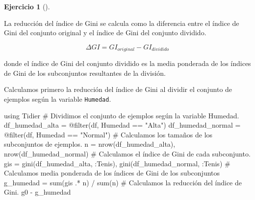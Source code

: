 \documentclass[
  a4paper,
]{scrreport}
\newenvironment{Shaded}{\begin{snugshade}}{\end{snugshade}}
\newcommand{\BuiltInTok}[1]{\textcolor[rgb]{0.00,0.23,0.31}{#1}}
\newcommand{\CommentTok}[1]{\textcolor[rgb]{0.37,0.37,0.37}{#1}}
\newcommand{\FunctionTok}[1]{\textcolor[rgb]{0.28,0.35,0.67}{#1}}
\newcommand{\ImportTok}[1]{\textcolor[rgb]{0.00,0.46,0.62}{#1}}
\newcommand{\NormalTok}[1]{\textcolor[rgb]{0.00,0.23,0.31}{#1}}
\newcommand{\OperatorTok}[1]{\textcolor[rgb]{0.37,0.37,0.37}{#1}}
\newcommand{\PreprocessorTok}[1]{\textcolor[rgb]{0.68,0.00,0.00}{#1}}
\newcommand{\StringTok}[1]{\textcolor[rgb]{0.13,0.47,0.30}{#1}}
\theoremstyle{definition}
\newtheorem{exercise}{Ejercicio}[chapter]
\theoremstyle{remark}
\begin{document}
\begin{exercise}[]
\begin{enumerate}
\begin{tcolorbox}
  La reducción del índice de Gini se calcula como la diferencia entre el
  índice de Gini del conjunto original y el índice de Gini del conjunto
  dividido.

  \[ \Delta GI = GI_{original} - GI_{dividido} \]

  donde el índice de Gini del conjunto dividido es la media ponderada de
  los índices de Gini de los subconjuntos resultantes de la división.

  \end{tcolorbox}

  \begin{tcolorbox}[enhanced jigsaw, toptitle=1mm, breakable, toprule=.15mm, opacitybacktitle=0.6, coltitle=black, titlerule=0mm, arc=.35mm, title=\textcolor{quarto-callout-tip-color}{\faLightbulb}\hspace{0.5em}{Solución}, rightrule=.15mm, opacityback=0, colback=white, bottomrule=.15mm, leftrule=.75mm, colbacktitle=quarto-callout-tip-color!10!white, bottomtitle=1mm, colframe=quarto-callout-tip-color-frame, left=2mm]

  Calculamos primero la reducción del índice de Gini al dividir el
  conjunto de ejemplos según la variable \texttt{Humedad}.

\begin{Shaded}
\begin{Highlighting}[]
\ImportTok{using} \BuiltInTok{Tidier}
\CommentTok{\# Dividimos el conjunto de ejemplos según la variable Humedad.}
\NormalTok{df\_humedad\_alta }\OperatorTok{=} \PreprocessorTok{@filter}\NormalTok{(df, Humedad }\OperatorTok{==} \StringTok{"Alta"}\NormalTok{)}
\NormalTok{df\_humedad\_normal }\OperatorTok{=} \PreprocessorTok{@filter}\NormalTok{(df, Humedad }\OperatorTok{==} \StringTok{"Normal"}\NormalTok{)}
\CommentTok{\# Calculamos los tamaños de los subconjuntos de ejemplos.}
\NormalTok{n }\OperatorTok{=} \FunctionTok{nrow}\NormalTok{(df\_humedad\_alta), }\FunctionTok{nrow}\NormalTok{(df\_humedad\_normal)}
\CommentTok{\# Calculamos el índice de Gini de cada subconjunto.}
\NormalTok{gis }\OperatorTok{=} \FunctionTok{gini}\NormalTok{(df\_humedad\_alta, }\OperatorTok{:}\NormalTok{Tenis), }\FunctionTok{gini}\NormalTok{(df\_humedad\_normal, }\OperatorTok{:}\NormalTok{Tenis)}
\CommentTok{\# Calculamos media ponderada de los índices de Gini de los subconjuntos }
\NormalTok{g\_humedad }\OperatorTok{=} \FunctionTok{sum}\NormalTok{(gis }\OperatorTok{.*}\NormalTok{ n) }\OperatorTok{/} \FunctionTok{sum}\NormalTok{(n)}
\CommentTok{\# Calculamos la reducción del índice de Gini.}
\NormalTok{g0 }\OperatorTok{{-}}\NormalTok{ g\_humedad}
\end{Highlighting}
\end{Shaded}


\end{tcolorbox}
\end{enumerate}
\end{exercise}
\end{document}
